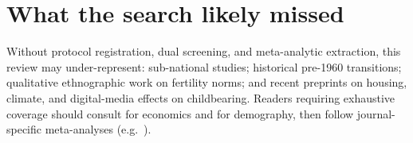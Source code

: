 \section{What the search likely missed}

Without protocol registration, dual screening, and meta-analytic extraction, this review may under-represent: sub-national studies; historical pre-1960 transitions; qualitative ethnographic work on fertility norms; and recent preprints on housing, climate, and digital-media effects on childbearing. Readers requiring exhaustive coverage should consult \citet{doepke2023} for economics and \citet{frejka2017} for demography, then follow journal-specific meta-analyses (e.g.\ \citealp{luci2013,sobotka2020}).
